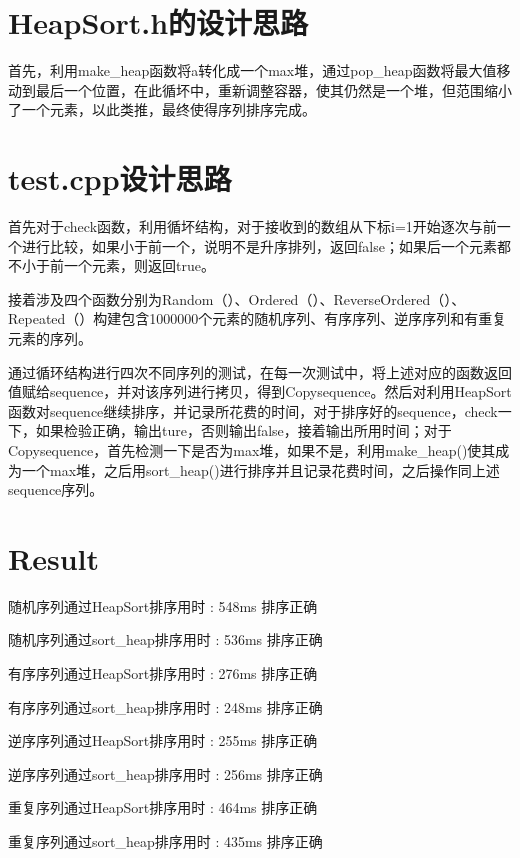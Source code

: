 \documentclass[UTF8]{ctexart}
\begin{document}
\pagestyle{fancy}
\fancyhead{}

\section{HeapSort.h的设计思路}
	
首先，利用make\_heap函数将a转化成一个max堆，通过pop\_heap函数将最大值移动到最后一个位置，在此循坏中，重新调整容器，使其仍然是一个堆，但范围缩小了一个元素，以此类推，最终使得序列排序完成。

\section{test.cpp设计思路}

首先对于check函数，利用循坏结构，对于接收到的数组从下标i=1开始逐次与前一个进行比较，如果小于前一个，说明不是升序排列，返回false；如果后一个元素都不小于前一个元素，则返回true。

接着涉及四个函数分别为Random（）、Ordered（）、ReverseOrdered（）、Repeated（）构建包含1000000个元素的随机序列、有序序列、逆序序列和有重复元素的序列。

通过循环结构进行四次不同序列的测试，在每一次测试中，将上述对应的函数返回值赋给sequence，并对该序列进行拷贝，得到Copysequence。然后对利用HeapSort函数对sequence继续排序，并记录所花费的时间，对于排序好的sequence，check一下，如果检验正确，输出ture，否则输出false，接着输出所用时间；对于Copysequence，首先检测一下是否为max堆，如果不是，利用make\_heap()使其成为一个max堆，之后用sort\_heap()进行排序并且记录花费时间，之后操作同上述sequence序列。

\section{Result}

随机序列通过HeapSort排序用时 : 548ms 排序正确

随机序列通过sort\_heap排序用时 : 536ms 排序正确

有序序列通过HeapSort排序用时 : 276ms 排序正确

有序序列通过sort\_heap排序用时 : 248ms 排序正确

逆序序列通过HeapSort排序用时 : 255ms 排序正确

逆序序列通过sort\_heap排序用时 : 256ms 排序正确

重复序列通过HeapSort排序用时 : 464ms 排序正确

重复序列通过sort\_heap排序用时 : 435ms 排序正确
\end{document}
